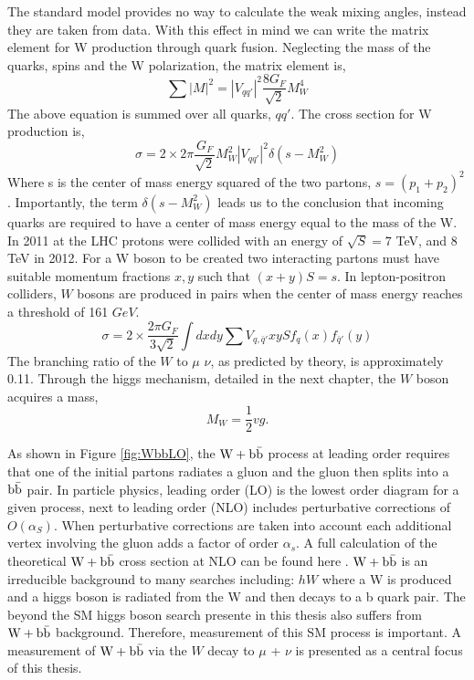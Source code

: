 The standard model provides no way to calculate the weak mixing angles, instead they
are taken from data.
With this effect in mind we can write the matrix element for W production through quark fusion.
Neglecting the mass of the quarks, spins and the W polarization, the matrix element is,
\begin{equation}
\sum|M|^{2}=|V_{qq'}|^{2}\frac{8G_{F}}{\sqrt{2}}M_{W}^{4}
\end{equation}
The above equation is summed over all quarks, $qq'$. The cross section for W production is,
\begin{equation}
\sigma=2\times2\pi\frac{G_{F}}{\sqrt{2}}M_{W}^{2}|V_{qq'}|^{2}\delta(s-M_{W}^{2})
\end{equation}
Where s is the center of mass energy squared of the two partons, $s=(p_{1}+p_{2})^{2}$.
Importantly, the term $\delta(s-M_{W}^{2})$ leads us to the 
conclusion that incoming quarks are required to have a center of mass energy
equal to the mass of the W. 
In 2011 at the LHC protons were collided with an energy of $\sqrt{S}=7$ TeV, and 8 TeV in 2012.
For a W boson to be created two interacting partons must have suitable
momentum fractions $x, y$ such that $(x+y)S=s$.
In lepton-positron colliders, $W$ bosons are produced in pairs when 
the center of mass energy reaches a threshold of 161 $GeV$. 
\begin{equation}
\sigma=2\times\frac{2\pi G_{F}}{3\sqrt{2}}\int{dxdy \sum{V_{q,\bar{q}'}}xyS f_{q}(x)f_{\bar{q}'}(y)}
\end{equation}
The branching ratio of the $W$ to $\mu$ $\nu$, as predicted by theory, is approximately 0.11. 
Through the higgs mechanism, detailed in the next chapter, the $W$ boson acquires a mass, 
\begin{equation}
M_{W}=\frac{1}{2}v g.
\end{equation}

As shown in Figure \ref{fig:WbbLO}, the $\mathrm{W+\mathrm{b\bar{b}}}$ process at 
leading order requires that one of the initial partons
radiates a gluon and the gluon then splits into a $\mathrm{b\bar{b}}$ pair. In particle physics, leading
order (LO) is the lowest order diagram for a given process,
next to leading order (NLO) includes perturbative corrections of $O(\alpha_{S})$. 
When perturbative corrections are taken into account each additional
vertex involving the gluon adds a factor of order $\alpha_{s}$. A full
calculation of the theoretical $\mathrm{W+\mathrm{b\bar{b}}}$ cross section at NLO can be found here \cite{Campbell:2010ff, Badger:2010mg}.
$\mathrm{W+\mathrm{b\bar{b}}}$ is an irreducible background to many searches including:
$hW$ where a W is produced and a higgs boson is radiated from the W
and then decays to a b quark pair. 
The beyond the SM higgs boson search presente in this thesis also suffers
from $\mathrm{W+\mathrm{b\bar{b}}}$ background. Therefore, measurement of this SM process is
important. 
A measurement of $\mathrm{W+\mathrm{b\bar{b}}}$ via the $W$ decay to $\mu$ + $\nu$ is presented as a 
central focus of this thesis.

